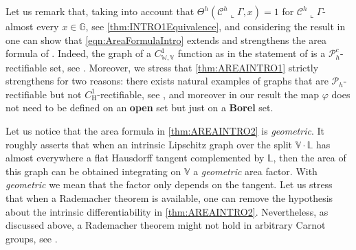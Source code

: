 \documentclass[10pt, a4paper,
oneside, headinclude,footinclude]{scrartcl}
\begin{document}
Let us remark that, taking into account that $\Theta^{h}(\mathcal{C}^h\llcorner\Gamma,x)=1$ for $\mathcal{C}^h\llcorner\Gamma$-almost every $x\in\mathbb G$, see \cref{thm:INTRO1Equivalence}, and considering the result in \cite[Corollary 3.6]{JNGV20} one can show that \eqref{eqn:AreaFormulaIntro} extends and strengthens the area formula of  \cite[Theorem 1.1]{JNGV20}. Indeed, the graph of a $C^1_{\mathbb W,\mathbb V}$ function as in the statement of \cite[Theorem 1.1]{JNGV20} is a $\mathscr{P}_h^c$-rectifiable set, see \cite[Proposition 6.2]{antonelli2020rectifiable}. Moreover, we stress that \cref{thm:AREAINTRO1} strictly strengthens \cite[Theorem 1.1]{JNGV20} for two reasons: there exists natural examples of graphs that are $\mathscr{P}_h$-rectifiable but not $C^1_{\mathrm H}$-rectifiable, see \cite[Remark 6.3]{antonelli2020rectifiable}, and moreover in our result the map $\varphi$ does not need to be defined on an \textbf{open} set but just on a \textbf{Borel} set. 


Let us notice that the area formula in \cref{thm:AREAINTRO2} is \textit{geometric}. It roughly asserts that when an intrinsic Lipschitz graph over the split $\mathbb V\cdot\mathbb L$ has almost everywhere a flat Hausdorff tangent complemented by $\mathbb L$, then the area of this graph can be obtained integrating on $\mathbb V$ a \textit{geometric} area factor. With \textit{geometric} we mean that the factor only depends on the tangent. Let us stress that when a Rademacher theorem is available, one can remove the hypothesis about the intrinsic differentiability in \cref{thm:AREAINTRO2}. Nevertheless, as discussed above, a Rademacher theorem might not hold in arbitrary Carnot groups, see \cite{JNGV20a}. 
\end{document}
